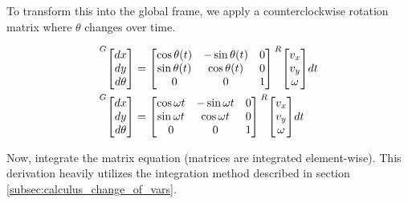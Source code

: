 To transform this into the global frame, we apply a counterclockwise rotation
matrix where $\theta$ changes over time.

\begin{align*}
  \prescript{G}{}{\begin{bmatrix}
    dx \\
    dy \\
    d\theta
  \end{bmatrix}} &=
  \begin{bmatrix}
    \cos\theta(t) & -\sin\theta(t) & 0 \\
    \sin\theta(t) &  \cos\theta(t) & 0 \\
                0 &              0 & 1
  \end{bmatrix}
  \prescript{R}{}{\begin{bmatrix}
    v_x \\
    v_y \\
    \omega
  \end{bmatrix}} dt \\
  \prescript{G}{}{\begin{bmatrix}
    dx \\
    dy \\
    d\theta
  \end{bmatrix}} &=
  \begin{bmatrix}
    \cos\omega t & -\sin\omega t & 0 \\
    \sin\omega t &  \cos\omega t & 0 \\
               0 &             0 & 1
  \end{bmatrix}
  \prescript{R}{}{\begin{bmatrix}
    v_x \\
    v_y \\
    \omega
  \end{bmatrix}} dt
\end{align*}

Now, integrate the matrix equation (matrices are integrated element-wise). This
derivation heavily utilizes the integration method described in section
\ref{subsec:calculus_change_of_vars}.


